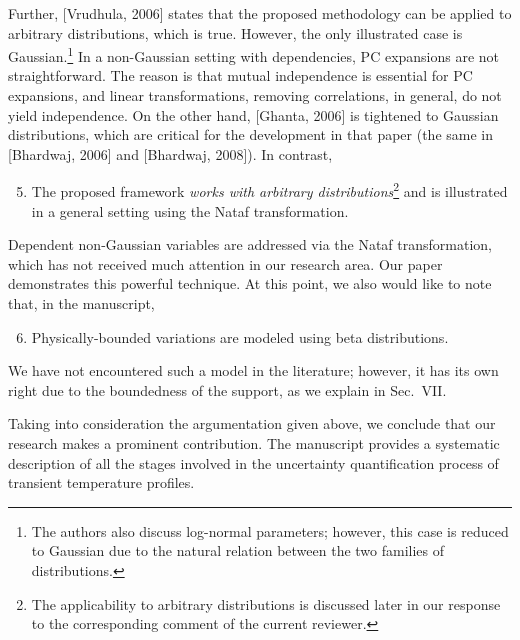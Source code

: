 \begin{authors}
Further, [Vrudhula, 2006] states that the proposed methodology can be applied to arbitrary distributions, which is true.
However, the only illustrated case is Gaussian.\footnote{The authors also discuss log-normal parameters; however, this case is reduced to Gaussian due to the natural relation between the two families of distributions.}
In a non-Gaussian setting with dependencies, PC expansions are not straightforward.
The reason is that mutual independence is essential for PC expansions, and linear transformations, removing correlations, in general, do not yield independence.
On the other hand, [Ghanta, 2006] is tightened to Gaussian distributions, which are critical for the development in that paper (the same in [Bhardwaj, 2006] and [Bhardwaj, 2008]).
In contrast,
\begin{enumerate}
  \setcounter{enumi}{4}
  \item The proposed framework \emph{works with arbitrary distributions}\footnote{The applicability to arbitrary distributions is discussed later in our response to the corresponding comment of the current reviewer.} and is illustrated in a general setting using the Nataf transformation.
\end{enumerate}
Dependent non-Gaussian variables are addressed via the Nataf transformation, which has not received much attention in our research area.
Our paper demonstrates this powerful technique.
At this point, we also would like to note that, in the manuscript,
\begin{enumerate}
  \setcounter{enumi}{5}
  \item Physically-bounded variations are modeled using beta distributions.
\end{enumerate}
We have not encountered such a model in the literature; however, it has its own right due to the boundedness of the support, as we explain in Sec.~VII.

Taking into consideration the argumentation given above, we conclude that our research makes a prominent contribution.
The manuscript provides a systematic description of all the stages involved in the uncertainty quantification process of transient temperature profiles.




\end{authors}

